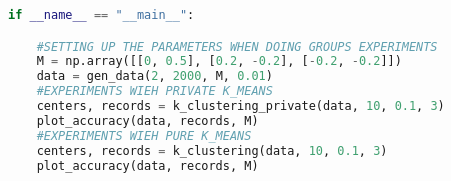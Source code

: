\begin{lstlisting}[label = code-p4-3, language=Python, caption=Python Code for Problem 4 - 3]
if __name__ == "__main__":

	#SETTING UP THE PARAMETERS WHEN DOING GROUPS EXPERIMENTS
	M = np.array([[0, 0.5], [0.2, -0.2], [-0.2, -0.2]])
	data = gen_data(2, 2000, M, 0.01)
	#EXPERIMENTS WIEH PRIVATE K_MEANS
	centers, records = k_clustering_private(data, 10, 0.1, 3)
	plot_accuracy(data, records, M)
	#EXPERIMENTS WIEH PURE K_MEANS
	centers, records = k_clustering(data, 10, 0.1, 3)
	plot_accuracy(data, records, M)



\end{lstlisting}

